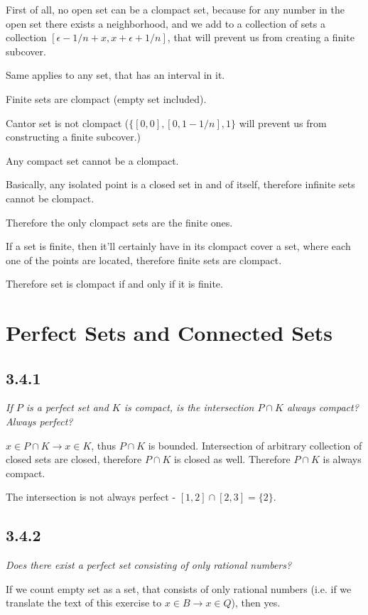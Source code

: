 \documentclass[11pt,oneside,titlepage]{book}
\begin{document}
First of all, no open set can be a clompact set, because for any number
in the open set there
exists a neighborhood, and we add to a collection of sets a collection
$[\epsilon - 1/n + x, x + \epsilon + 1/n]$, that will prevent us from
creating a finite subcover.

Same applies to any set, that has an interval in it.

Finite sets are clompact (empty set included).

Cantor set is not clompact
($\{[0, 0], [0, 1 - 1/n], 1 \}$ will prevent us from constructing a finite
subcover.)

Any compact set cannot be a clompact.

Basically, any isolated point is a closed set in and of itself, therefore
infinite sets cannot be clompact.

Therefore the only clompact sets are the finite ones.

If a set is finite, then it'll certainly have in its clompact cover a set, where
each one of the points are located, therefore finite sets are clompact.

Therefore set is clompact if and only if it is finite.

\section{Perfect Sets and Connected Sets}

\subsection*{3.4.1}
\textit{If $P$ is a perfect set and $K$ is compact, is the intersection
  $P \cap K$ always compact? Always perfect?}

$x \in P \cap K \to x \in K$, thus $P \cap K$ is bounded. Intersection of
arbitrary collection of closed sets are closed, therefore $P \cap K$ is
closed as well. Therefore $P \cap K$ is always compact.

The intersection is not always perfect - $[1, 2] \cap [2, 3] = \{2\}$.

\subsection*{3.4.2}
\textit{Does there exist a perfect set consisting of only rational numbers?}

If we count empty set as a set, that consists of only rational numbers
(i.e. if we translate the text of this exercise to $x \in B \to x \in Q$),
then yes.
\end{document}
